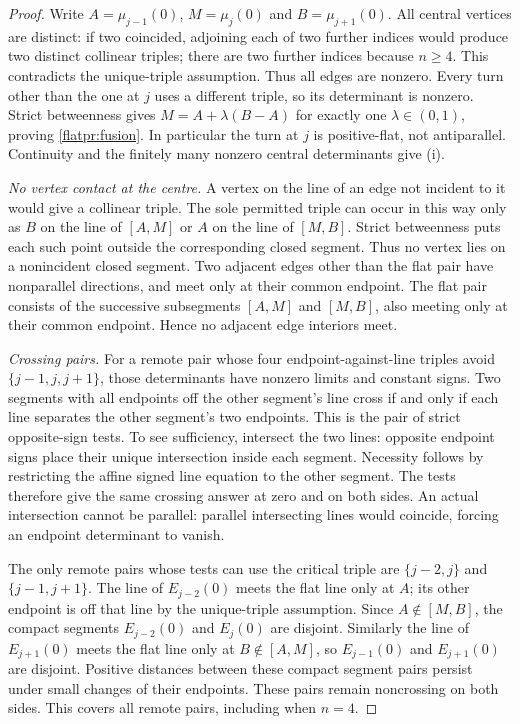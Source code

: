 \begin{proof}
Write $A=\mu_{j-1}(0)$, $M=\mu_j(0)$ and $B=\mu_{j+1}(0)$.
All central vertices are distinct: if two coincided, adjoining each
of two further indices would produce two distinct collinear triples;
there are two further indices because $n\geq4$. This contradicts the
unique-triple assumption. Thus all edges are nonzero. Every turn other
than the one at $j$ uses a different triple, so its determinant is
nonzero. Strict betweenness gives $M=A+\lambda(B-A)$ for exactly one
$\lambda\in(0,1)$, proving \eqref{flatpr:fusion}. In particular the
turn at $j$ is positive-flat, not antiparallel. Continuity and the
finitely many nonzero central determinants give (i).

\emph{No vertex contact at the centre.}
A vertex on the line of an edge not incident to it would give a
collinear triple. The sole permitted triple can occur in this way only
as $B$ on the line of $[A,M]$ or $A$ on the line of $[M,B]$.
Strict betweenness puts each such point outside the corresponding
closed segment. Thus no vertex lies on a nonincident closed segment.
Two adjacent edges other than the flat pair have nonparallel directions,
and meet only at their common endpoint. The flat pair consists of the
successive subsegments $[A,M]$ and $[M,B]$, also meeting only at their
common endpoint. Hence no adjacent edge interiors meet.

\emph{Crossing pairs.}
For a remote pair whose four endpoint-against-line triples avoid
$\{j-1,j,j+1\}$, those determinants have nonzero limits and constant
signs. Two segments with all endpoints off the other segment's line
cross if and only if each line separates the other segment's two
endpoints. This is the pair of strict opposite-sign tests. To see
sufficiency, intersect the two lines: opposite endpoint signs place
their unique intersection inside each segment. Necessity follows by
restricting the affine signed line equation to the other segment.
The tests therefore give the same crossing answer at zero and on both
sides. An actual intersection cannot be parallel: parallel intersecting
lines would coincide, forcing an endpoint determinant to vanish.

The only remote pairs whose tests can use the critical triple are
$\{j-2,j\}$ and $\{j-1,j+1\}$. The line of $E_{j-2}(0)$ meets the
flat line only at $A$; its other endpoint is off that line by the
unique-triple assumption. Since $A\notin[M,B]$, the compact segments
$E_{j-2}(0)$ and $E_j(0)$ are disjoint. Similarly the line of
$E_{j+1}(0)$ meets the flat line only at $B\notin[A,M]$, so
$E_{j-1}(0)$ and $E_{j+1}(0)$ are disjoint. Positive distances between
these compact segment pairs persist under small changes of their
endpoints. These pairs remain noncrossing on both sides. This covers
all remote pairs, including when $n=4$.


\end{proof}
